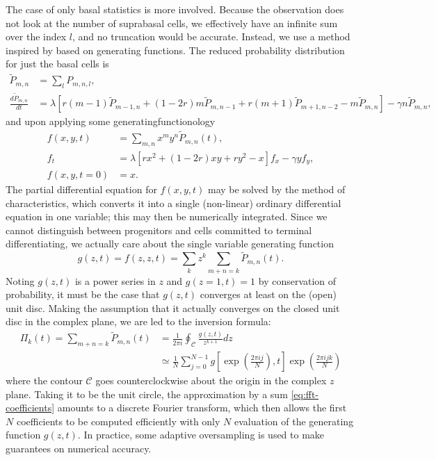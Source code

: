 \documentclass[10pt,english]{report}
\begin{document}
The case of only basal statistics is more involved. Because the observation does not look at the number of suprabasal cells, we effectively have an infinite sum over the index $l$, and no truncation would be accurate. Instead, we use a method inspired by \citet{tediousharvard} based on generating functions. The reduced probability distribution for just the basal cells is
\begin{align}
\tilde{P}_{m,n} &= \sum_l P_{m,n,l}, \nonumber \\
\frac{d\tilde{P}_{m,n}}{dt} &= \lambda\left[r (m-1)\tilde{P}_{m-1,n} + (1-2r)m\tilde{P}_{m,n-1} + r(m+1)\tilde{P}_{m+1,n-2} - m\tilde{P}_{m,n}\right] - \gamma n \tilde{P}_{m,n}, \label{eq:AB-master} 
\end{align}
and upon applying some generatingfunctionology
\begin{align}
f(x,y,t) &= \sum_{m,n} x^m y^n \tilde{P}_{m,n}(t), \nonumber \\
f_t &= \lambda \left[ r x^2 + (1-2r) xy + r y^2 - x \right] f_x - \gamma y f_y, \label{eq:AB-gf}\\
f(x,y,t=0) &= x. \nonumber
\end{align}
The partial differential equation for $f(x,y,t)$ may be solved by the method of characteristics, which converts it into a single (non-linear) ordinary differential equation in one variable; this may then be numerically integrated. Since we cannot distinguish between progenitors and cells committed to terminal differentiating, we actually care about the single variable generating function 
\begin{equation*}
g(z,t) = f(z,z,t) = \sum_k z^k \sum_{m+n=k} \tilde{P}_{m,n}(t).
\end{equation*} 
Noting $g(z,t)$ is a power series in $z$ and $g(z=1,t) = 1$ by conservation of probability, it must be the case that $g(z,t)$ converges at least on the (open) unit disc. Making the assumption that it actually converges on the closed unit disc in the complex plane, we are led to the inversion formula:
\begin{align}
\Pi_k(t) = \sum_{m+n=k} \tilde{P}_{m,n}(t) &= \frac{1}{2\pi i} \oint_\mathcal{C} \frac{g(z,t)}{z^{k+1}} dz \label{eq:cauchy-coefficients} \\
	&\simeq \frac{1}{N} \sum_{j=0}^{N-1} g\left[\exp\left(\frac{2\pi ij}{N}\right),t\right] \exp\left(\frac{2\pi ijk}{N}\right) \label{eq:fft-coefficients}
\end{align}
where the contour $\mathcal{C}$ goes counterclockwise about the origin in the complex $z$ plane. Taking it to be the unit circle, the approximation by a sum \eqref{eq:fft-coefficients} amounts to a discrete Fourier transform, which then allows the first $N$ coefficients to be computed efficiently with only $N$ evaluation of the generating function $g(z,t)$. In practice, some adaptive oversampling is used to make guarantees on numerical accuracy.
\end{document}
